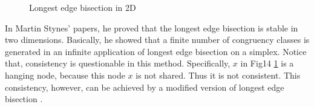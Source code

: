 \begin{figure}[h!]
\centering
{}
\caption{Longest edge bisection in 2D}
\label{Fig14}
\end{figure}

In Martin Stynes' papers, he proved that the longest edge bisection is stable \cite{stynes1979faster,stynes1980faster,stynes1979n} in two dimensions. Basically, he showed that a finite number of congruency classes is generated in an infinite application of longest edge bisection on a simplex. Notice that, consistency is questionable in this method. Specifically, $x$ in Fig14 \ref{Fig14} is a hanging node, because this node $x$ is not shared. Thus it is not consistent. This consistency, however, can be achieved by a modified version of longest edge bisection \cite{kˇriˇzek1997generate}.


